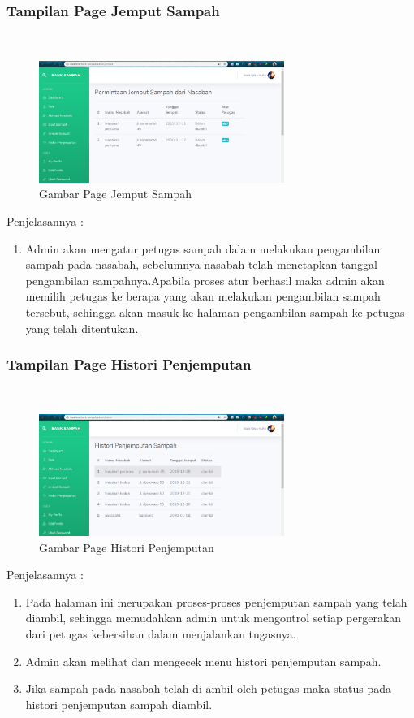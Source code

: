 \subsubsection{Tampilan Page Jemput Sampah}
\hfill\\
	\begin{figure}[H]
		\includegraphics[width=8cm]{figures/analisis/23.png}
		\centering
		\caption{Gambar Page Jemput Sampah}
	\end{figure}
Penjelasannya :	
\begin{enumerate}
\item Admin akan mengatur petugas sampah dalam melakukan pengambilan sampah pada nasabah, sebelumnya nasabah telah menetapkan tanggal pengambilan sampahnya.Apabila proses atur berhasil maka admin akan memilih petugas ke berapa yang akan melakukan pengambilan sampah tersebut, sehingga akan masuk ke halaman pengambilan sampah ke petugas yang telah ditentukan.
\end{enumerate}
	
\subsubsection{Tampilan Page Histori Penjemputan}
\hfill\\
	\begin{figure}[H]
		\includegraphics[width=8cm]{figures/analisis/24.png}
		\centering
		\caption{Gambar Page Histori Penjemputan}
	\end{figure}
Penjelasannya :
\begin{enumerate}
\item Pada halaman ini merupakan proses-proses penjemputan sampah yang telah diambil, sehingga memudahkan admin untuk mengontrol setiap pergerakan dari petugas kebersihan dalam menjalankan tugasnya.
\item Admin akan melihat dan mengecek menu histori penjemputan sampah.
\item Jika sampah pada nasabah telah di ambil oleh petugas maka status pada histori penjemputan sampah diambil.
\end{enumerate}


